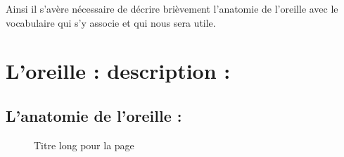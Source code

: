 Ainsi il s'avère nécessaire de décrire brièvement l'anatomie de l'oreille
avec le vocabulaire qui s'y associe et qui nous sera utile.

\section{L'oreille : description : }

\subsection{L'anatomie de l'oreille :}
\begin{figure}
	\centering
	\caption[Titre pour toc]{Titre long pour la page}
	\label{fig:-20160624berufsfeldgruppen}
\end{figure}


%

